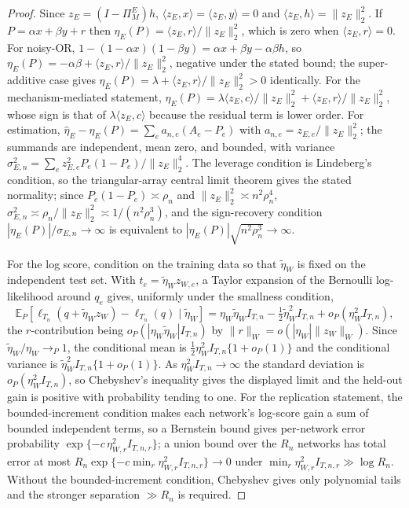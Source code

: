 \documentclass[12pt]{article}
\newcommand{\1}{\mathbf{1}}
\begin{document}
\begin{proof}
Since $z_E=(I-\Pi_M^E)h$, $\langle z_E,x\rangle=\langle z_E,y\rangle=0$ and $\langle z_E,h\rangle=\|z_E\|_2^2$.
If $P=\alpha x+\beta y+r$ then $\eta_E(P)=\langle z_E,r\rangle/\|z_E\|_2^2$, which is zero when
$\langle z_E,r\rangle=0$. For noisy-OR, $1-(1-\alpha x)(1-\beta y)=\alpha x+\beta y-\alpha\beta h$, so
$\eta_E(P)=-\alpha\beta+\langle z_E,r\rangle/\|z_E\|_2^2$, negative under the stated bound; the
super-additive case gives $\eta_E(P)=\lambda+\langle z_E,r\rangle/\|z_E\|_2^2>0$ identically. For the
mechanism-mediated statement, $\eta_E(P)=\lambda\langle z_E,c\rangle/\|z_E\|_2^2+\langle
z_E,r\rangle/\|z_E\|_2^2$, whose sign is that of $\lambda\langle z_E,c\rangle$ because the residual term is
lower order. For estimation, $\widehat\eta_E-\eta_E(P)=\sum_e a_{n,e}(A_e-P_e)$ with
$a_{n,e}=z_{E,e}/\|z_E\|_2^2$; the summands are independent, mean zero, and bounded, with variance
$\sigma_{E,n}^2=\sum_e z_{E,e}^2 P_e(1-P_e)/\|z_E\|_2^4$. The leverage condition is Lindeberg's condition,
so the triangular-array central limit theorem gives the stated normality; since $P_e(1-P_e)\asymp\rho_n$ and
$\|z_E\|_2^2\asymp n^2\rho_n^4$, $\sigma_{E,n}^2\asymp\rho_n/\|z_E\|_2^2\asymp 1/(n^2\rho_n^3)$, and the
sign-recovery condition $|\eta_E(P)|/\sigma_{E,n}\to\infty$ is equivalent to
$|\eta_E(P)|\sqrt{n^2\rho_n^3}\to\infty$.

For the log score, condition on the training data so that $\widetilde\eta_W$ is fixed on the independent
test set. With $t_e=\widetilde\eta_W z_{W,e}$, a Taylor expansion of the Bernoulli log-likelihood around
$q_e$ gives, uniformly under the smallness condition,
\[
    \mathbb E_P[\ell_{T_n}(q+\widetilde\eta_W z_W)-\ell_{T_n}(q)\mid\widetilde\eta_W]
    =\eta_W\widetilde\eta_W I_{T,n}-\tfrac12\widetilde\eta_W^2 I_{T,n}+o_P(\eta_W^2 I_{T,n}),
\]
the $r$-contribution being $o_P(|\eta_W\widetilde\eta_W|I_{T,n})$ by $\|r\|_W=o(|\eta_W|\|z_W\|_W)$. Since
$\widetilde\eta_W/\eta_W\to_P 1$, the conditional mean is $\tfrac12\eta_W^2 I_{T,n}\{1+o_P(1)\}$ and the
conditional variance is $\widetilde\eta_W^2 I_{T,n}\{1+o_P(1)\}$. As $\eta_W^2 I_{T,n}\to\infty$ the standard
deviation is $o_P(\eta_W^2 I_{T,n})$, so Chebyshev's inequality gives the displayed limit and the held-out
gain is positive with probability tending to one. For the replication statement, the bounded-increment
condition makes each network's log-score gain a sum of bounded independent terms, so a Bernstein bound gives
per-network error probability $\exp\{-c\,\eta_{W,r}^2 I_{T,n,r}\}$; a union bound over the $R_n$ networks has
total error at most $R_n\exp\{-c\min_r\eta_{W,r}^2 I_{T,n,r}\}\to 0$ under $\min_r\eta_{W,r}^2
I_{T,n,r}\gg\log R_n$. Without the bounded-increment condition, Chebyshev gives only polynomial tails and the
stronger separation $\gg R_n$ is required.
\end{proof}
\end{document}
